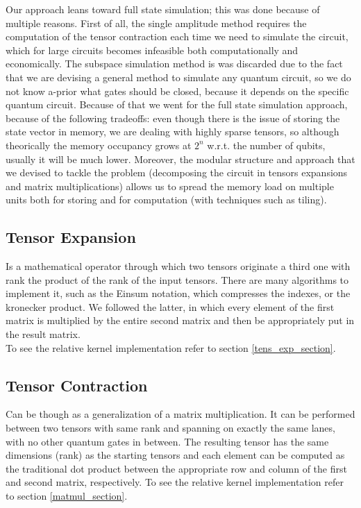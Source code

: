 \documentclass[12pt,oneside,a4paper]{article}
\begin{document}
Our approach leans toward full state simulation; this was done because of multiple reasons. First of all, the single amplitude method requires the computation of the tensor contraction each time we need to simulate the circuit, which for large circuits becomes infeasible both computationally and economically. The subspace simulation method is was discarded due to the fact that we are devising a general method to simulate any quantum circuit, so we do not know a-prior what gates should be closed, because it depends on the specific quantum circuit. Because of that we went for the full state simulation approach, because of the following tradeoffs: even though there is the issue of storing the state vector in memory, we are dealing with highly sparse tensors, so although theorically the memory occupancy grows at $2^n$ w.r.t. the number of qubits, usually it will be much lower. Moreover, the modular structure and approach that we devised to tackle the problem (decomposing the circuit in tensors expansions and matrix multiplications) allows us to spread the memory load on multiple units both for storing and for computation (with techniques such as tiling).

\subsection{Tensor Expansion}
Is a mathematical operator through which two tensors originate a third one with rank the product of the rank of the input tensors. There are many algorithms to implement it, such as the Einsum notation, which compresses the indexes, or the kronecker product. We followed the latter, in which every element of the first matrix is multiplied by the entire second matrix and then be appropriately put in the result matrix.\\
To see the relative kernel implementation refer to section \ref{tens_exp_section}.

\subsection{Tensor Contraction}
Can be though as a generalization of a matrix multiplication. It can be performed between two tensors with same rank and spanning on exactly the same lanes, with no other quantum gates in between. The resulting tensor has the same dimensions (rank) as the starting tensors and each element can be computed as the traditional dot product between the appropriate row and column of the first and second matrix, respectively.
To see the relative kernel implementation refer to section \ref{matmul_section}.
\end{document}
